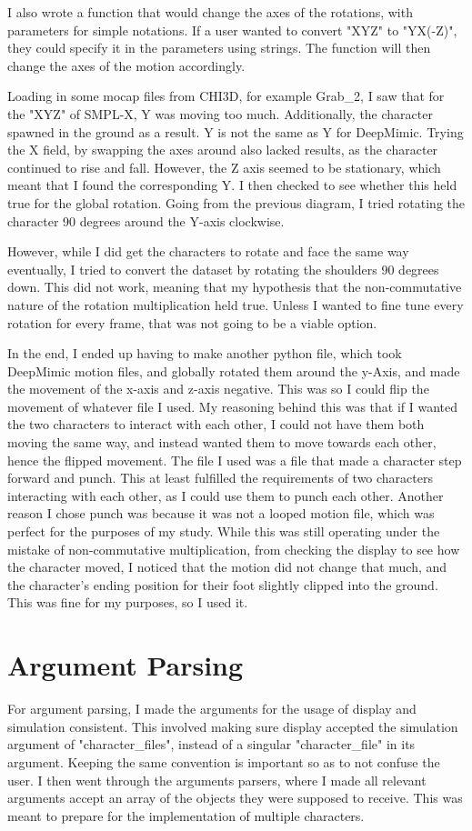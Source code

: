 \documentclass{l4proj}
\begin{document}
I also wrote a function that would change the axes of the rotations, with parameters for simple notations. If a user wanted to convert "XYZ" to "YX(-Z)", they could specify it in the parameters using strings. The function will then change the axes of the motion accordingly.

Loading in some mocap files from CHI3D, for example Grab\_2, I saw that for the "XYZ" of SMPL-X, Y was moving too much. Additionally, the character spawned in the ground as a result. Y is not the same as Y for DeepMimic. Trying the X field, by swapping the axes around also lacked results, as the character continued to rise and fall. However, the Z axis seemed to be stationary, which meant that I found the corresponding Y. I then checked to see whether this held true for the global rotation. Going from the previous diagram, I tried rotating the character 90 degrees around the Y-axis clockwise.

However, while I did get the characters to rotate and face the same way eventually, I tried to convert the dataset by rotating the shoulders 90 degrees down. This did not work, meaning that my hypothesis that the non-commutative nature of the rotation multiplication held true. Unless I wanted to fine tune every rotation for every frame, that was not going to be a viable option.

In the end, I ended up having to make another python file, which took DeepMimic motion files, and globally rotated them around the y-Axis, and made the movement of the x-axis and z-axis negative. This was so I could flip the movement of whatever file I used. My reasoning behind this was that if I wanted the two characters to interact with each other, I could not have them both moving the same way, and instead wanted them to move towards each other, hence the flipped movement. The file I used was a file that made a character step forward and punch. This at least fulfilled the requirements of two characters interacting with each other, as I could use them to punch each other. Another reason I chose punch was because it was not a looped motion file, which was perfect for the purposes of my study. While this was still operating under the mistake of non-commutative multiplication, from checking the display to see how the character moved, I noticed that the motion did not change that much, and the character's ending position for their foot slightly clipped into the ground. This was fine for my purposes, so I used it.

\section{Argument Parsing}
For argument parsing, I made the arguments for the usage of display and simulation consistent. This involved making sure display accepted the simulation argument of "character\_files", instead of a singular "character\_file" in its argument. Keeping the same convention is important so as to not confuse the user. I then went through the arguments parsers, where I made all relevant arguments accept an array of the objects they were supposed to receive. This was meant to prepare for the implementation of multiple characters.
\end{document}
